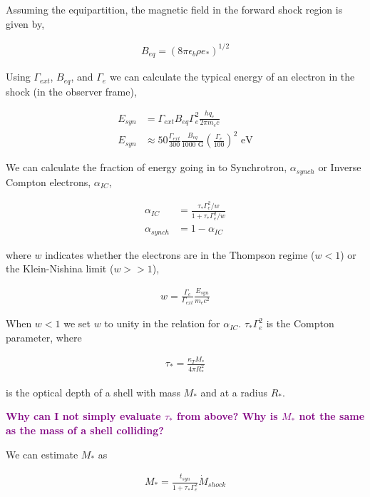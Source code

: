 \documentclass[linenumbers,twocolumn]{aastex631}
\newcommand{\mm}[1]{{\textcolor{purple}{\bf #1}}}
\begin{document}
Assuming the equipartition, the magnetic field in the forward shock region is given by,

\begin{align}
B_{eq} = (8\pi \epsilon_b \rho e_*)^{1/2}
\end{align}

Using $\Gamma_{ext}$, $B_{eq}$, and $\Gamma_e$ we can calculate the typical energy of an electron in the shock (in the observer frame),

\begin{align}
	E_{syn} &= \Gamma_{ext} B_{eq} \Gamma_{e}^2 \frac{hq_e}{2\pi m_e c}\\
	E_{syn} &\approx 50 \frac{\Gamma_{ext}}{300} \frac{B_{eq}}{1000\text{ G}} \left(\frac{\Gamma_e}{100}\right)^{2}\text{ eV}
\end{align}

We can calculate the fraction of energy going in to Synchrotron, $\alpha_{synch}$ or Inverse Compton electrons, $\alpha_{IC}$,

\begin{align}
	\alpha_{IC} &= \frac{\tau_* \Gamma_e^2 / w}{1+ \tau_* \Gamma_e^2 / w}\\
	\alpha_{synch} &= 1-\alpha_{IC}
\end{align} 

where $w$ indicates whether the electrons are in the Thompson regime ($w<1$) or the Klein-Nishina limit ($w>>1$),

\begin{align}
	w = \frac{\Gamma_e}{\Gamma_{ext}} \frac{E_{syn}}{m_e c^2}
\end{align}

When $w<1$ we set $w$ to unity in the relation for $\alpha_{IC}$. $\tau_*\Gamma_e^2$ is the Compton parameter, where

\begin{align} \label{eq: tau}
	\tau_* = \frac{\kappa_T M_*}{4 \pi R_*^2}
\end{align}

is the optical depth of a shell with mass $M_*$ and at a radius $R_*$. 

\mm{Why can I not simply evaluate $\tau_*$ from above? Why is $M_*$ not the same as the mass of a shell colliding?}

We can estimate $M_*$ as

\begin{align} \label{eq: mstar}
	M_* = \frac{t_{syn}}{1+\tau_*\Gamma_e^2}\dot{M}_{shock}
\end{align}
\end{document}
